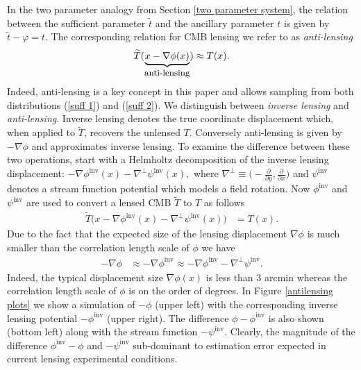 \documentclass[noinfoline]{imsart}
\begin{document}
In the two parameter analogy from Section \ref{two parameter system},  the relation between the sufficient parameter $\widetilde t$ and the ancillary parameter $t$ is given by $\widetilde t - \varphi = t$. The corresponding relation for CMB lensing we refer to as {\em anti-lensing}
\begin{equation}
\label{antilense}
 \widetilde T(\underbrace{x-\nabla\phi(x)}_\text{\small anti-lensing}) \approx T(x).%
\end{equation}
Indeed,  anti-lensing is a key concept in this paper and allows sampling from both distributions (\ref{suff 1}) and (\ref{suff 2}).
We distinguish between {\em inverse lensing} and  {\em anti-lensing}. Inverse lensing denotes the true coordinate displacement which, when applied to  $\widetilde T$, recovers the unlensed $T$. Conversely  anti-lensing is  given by $-\nabla\phi$ and approximates inverse lensing.  
To examine the difference between these two operations, start with a Helmholtz decomposition of the inverse lensing displacement: $-\nabla \phi^\text{inv}(x) - \nabla^\perp \psi^\text{inv}(x),$  where $\nabla^\perp \equiv \bigr(-\frac{\partial}{\partial y},\frac{\partial}{\partial x} \bigl)$ and  $\psi^\text{inv}$ denotes a stream function potential which models a field rotation. Now $\phi^\text{inv}$ and $\psi^\text{inv}$ are used to convert a lensed CMB $\widetilde T$ to $T$ as follows 
\begin{align*}
\widetilde T\bigl(x-\nabla \phi^\text{inv}(x) - \nabla^\perp \psi^\text{inv}(x)\bigr) &= T(x).
\end{align*}
Due to the fact that the expected size of the lensing displacement $\nabla\phi$ is much smaller than the correlation length scale of $\phi$ we have
\begin{align}
\label{anti approx}
-\nabla\phi &\approx -\nabla\phi^\text{inv} \approx -\nabla\phi^\text{inv}- \nabla^\perp \psi^\text{inv}.
\end{align}
Indeed, the typical displacement size $\nabla \phi(x)$ is less than 3 arcmin whereas the correlation length scale of $\phi$ is on the order of degrees. In Figure \ref{antilensing plots} we show a simulation of  $-\phi$ (upper left) with the corresponding inverse lensing potential $-\phi^\text{inv}$ (upper right). The difference $\phi - \phi^\text{inv}$ is also shown (bottom left) along with the stream function $-\psi^\text{inv}$. Clearly, the magnitude of the difference  $\phi^\text{inv}-\phi$ and $-\psi^\text{inv}$ sub-dominant to estimation error expected in current lensing experimental conditions.
\end{document}

